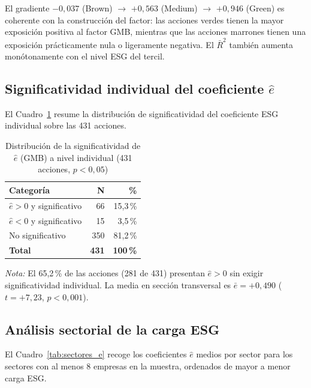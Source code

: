 \documentclass[12pt, a4paper]{article}
\begin{document}
El gradiente $-0{,}037$ (Brown) $\to$ $+0{,}563$ (Medium) $\to$ $+0{,}946$ (Green)
es coherente con la construcci\'on del factor: las acciones verdes tienen la mayor
exposici\'on positiva al factor GMB, mientras que las acciones marrones tienen una
exposici\'on pr\'acticamente nula o ligeramente negativa. El $\bar{R}^2$ tambi\'en
aumenta mon\'otonamente con el nivel ESG del tercil.

\subsection{Significatividad individual del coeficiente $\hat{e}$}
\label{subsec:significatividad}

El Cuadro~\ref{tab:significatividad} resume la distribuci\'on de significatividad del
coeficiente ESG individual sobre las 431 acciones.

\begin{table}[H]
  \centering
  \caption{Distribuci\'on de la significatividad de $\hat{e}$ (GMB) a nivel individual
  (431 acciones, $p < 0{,}05$)}
  \label{tab:significatividad}
  \begin{tabular}{lrr}
    \toprule
    Categor\'ia & N & \% \\
    \midrule
    $\hat{e} > 0$ y significativo  & 66  & 15{,}3\,\% \\
    $\hat{e} < 0$ y significativo  & 15  & 3{,}5\,\% \\
    No significativo               & 350 & 81{,}2\,\% \\
    \midrule
    \textbf{Total}                 & \textbf{431} & \textbf{100\,\%} \\
    \bottomrule
  \end{tabular}
  \begin{minipage}{\linewidth}
    \small\vspace{0.3em}
    \textit{Nota:} El 65{,}2\,\% de las acciones (281 de 431) presentan
    $\hat{e} > 0$ sin exigir significatividad individual. La media en secci\'on
    transversal es $\bar{e} = +0{,}490$ ($t = +7{,}23$, $p < 0{,}001$).
  \end{minipage}
\end{table}

\subsection{An\'alisis sectorial de la carga ESG}
\label{subsec:sectorial}

El Cuadro~\ref{tab:sectores_e} recoge los coeficientes $\hat{e}$ medios por sector
para los sectores con al menos 8 empresas en la muestra, ordenados de mayor a
menor carga ESG.
\end{document}
